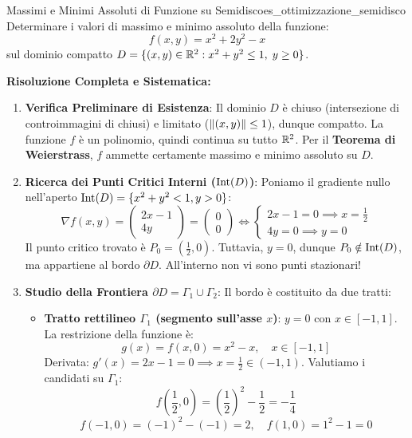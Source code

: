 \begin{esempio}{Massimi e Minimi Assoluti di Funzione su Semidisco}{es_ottimizzazione_semidisco}
Determinare i valori di massimo e minimo assoluto della funzione:
\[
f(x,y) = x^2 + 2y^2 - x
\]
sul dominio compatto $D = \{(x,y) \in \mathbb{R}^2 : x^2 + y^2 \le 1, \; y \ge 0\}$.

\medskip\noindent\textbf{Risoluzione Completa e Sistematica:}
\begin{enumerate}
    \item \textbf{Verifica Preliminare di Esistenza}:
    Il dominio $D$ è chiuso (intersezione di controimmagini di chiusi) e limitato ($\lVert(x,y)\rVert \le 1$), dunque compatto. La funzione $f$ è un polinomio, quindi continua su tutto $\mathbb{R}^2$. Per il \textbf{Teorema di Weierstrass}, $f$ ammette certamente massimo e minimo assoluto su $D$.

    \item \textbf{Ricerca dei Punti Critici Interni ($\operatorname{Int}(D)$)}:
    Poniamo il gradiente nullo nell'aperto $\operatorname{Int}(D) = \{x^2+y^2 < 1, y > 0\}$:
    \[
    \nabla f(x,y) = \begin{pmatrix} 2x - 1 \\ 4y \end{pmatrix} = \begin{pmatrix} 0 \\ 0 \end{pmatrix} \iff \begin{cases} 2x - 1 = 0 \implies x = \frac{1}{2} \\ 4y = 0 \implies y = 0 \end{cases}
    \]
    Il punto critico trovato è $P_0 = \left(\frac{1}{2}, 0\right)$. Tuttavia, $y = 0$, dunque $P_0 \notin \operatorname{Int}(D)$, ma appartiene al bordo $\partial D$. All'interno non vi sono punti stazionari!

    \item \textbf{Studio della Frontiera $\partial D = \Gamma_1 \cup \Gamma_2$}:
    Il bordo è costituito da due tratti:
    \begin{itemize}
        \item \textbf{Tratto rettilineo $\Gamma_1$ (segmento sull'asse $x$)}: $y = 0$ con $x \in [-1, 1]$.
        La restrizione della funzione è:
        \[
        g(x) = f(x, 0) = x^2 - x, \quad x \in [-1, 1]
        \]
        Derivata: $g'(x) = 2x - 1 = 0 \implies x = \frac{1}{2} \in (-1, 1)$.
        Valutiamo i candidati su $\Gamma_1$:
        \[
        f\left(\frac{1}{2}, 0\right) = \left(\frac{1}{2}\right)^2 - \frac{1}{2} = -\frac{1}{4}
        \]
        \[
        f(-1, 0) = (-1)^2 - (-1) = 2, \quad f(1, 0) = 1^2 - 1 = 0
        \]


\end{itemize}
\end{enumerate}
\end{esempio}
